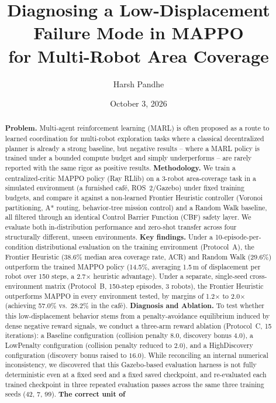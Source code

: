 \documentclass[11pt]{article}
\title{Diagnosing a Low-Displacement Failure Mode in MAPPO\\
for Multi-Robot Area Coverage}
\author{Harsh Pandhe}
\date{October 3, 2026}
\begin{document}
\maketitle

\begin{abstract}
\textbf{Problem.} Multi-agent reinforcement learning (MARL) is often
proposed as a route to learned coordination for multi-robot exploration
tasks where a classical decentralized planner is already a strong
baseline, but negative results -- where a MARL policy is trained under a
bounded compute budget and simply underperforms -- are rarely reported with the
same rigor as positive results.
\textbf{Methodology.} We train a centralized-critic MAPPO policy (Ray
RLlib) on a 3-robot area-coverage task in a simulated environment
(a furnished caf\'e, ROS~2/Gazebo) under fixed training budgets, and compare
it against a non-learned Frontier Heuristic controller (Voronoi
partitioning, A* routing, behavior-tree mission control) and a Random Walk
baseline, all filtered through an identical Control Barrier Function (CBF)
safety layer. We evaluate both in-distribution performance and zero-shot
transfer across four structurally different, unseen environments.
\textbf{Key findings.} Under a 10-episode-per-condition distributional
evaluation on the training environment (Protocol~A), the Frontier
Heuristic (38.6\% median area coverage rate, ACR) and Random Walk
(29.6\%) outperform the trained MAPPO policy (14.5\%, averaging 1.5\,m of
displacement per robot over 150 steps, a 2.7$\times$ heuristic advantage).
Under a separate, single-seed cross-environment matrix (Protocol~B,
150-step episodes, 3 robots), the Frontier Heuristic outperforms MAPPO in
every environment tested, by margins of 1.2$\times$ to 2.0$\times$
(achieving 57.0\% vs.\ 28.2\% in the caf\'e).
\textbf{Diagnosis and Ablation.} To test whether this low-displacement
behavior stems from a penalty-avoidance equilibrium induced by dense
negative reward signals, we conduct a three-arm reward ablation
(Protocol~C, 15 iterations): a Baseline configuration (collision penalty
$8.0$, discovery bonus $4.0$), a LowPenalty configuration (collision
penalty reduced to $2.0$), and a HighDiscovery configuration (discovery
bonus raised to $16.0$). While reconciling an internal numerical
inconsistency, we discovered that this Gazebo-based evaluation harness is
not fully deterministic even at a fixed seed and a fixed saved checkpoint,
and re-evaluated each trained checkpoint in three repeated evaluation passes
across the same three training seeds (42, 7, 99). \textbf{The correct unit of
}
\end{abstract}
\end{document}
